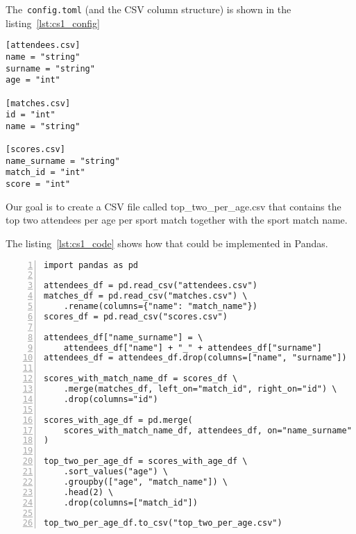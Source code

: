 The~\verb|config.toml| (and the CSV column structure) is shown in the listing~\ref{lst:cs1_config}

\begin{lstlisting}[caption=config.toml of the first case study, label={lst:cs1_config}, captionpos=b]
[attendees.csv]
name = "string"
surname = "string"
age = "int"

[matches.csv]
id = "int"
name = "string"

[scores.csv]
name_surname = "string"
match_id = "int"
score = "int"
\end{lstlisting}

Our goal is to create a CSV file called top\_two\_per\_age.csv that contains the top two attendees per age per sport match
together with the sport match name.

The listing~\ref{lst:cs1_code} shows how that could be implemented in Pandas.

\begin{lstlisting}[caption=Solution of the first case study in Pandas, label={lst:cs1_code}, captionpos=b, numbers=left]
import pandas as pd

attendees_df = pd.read_csv("attendees.csv")
matches_df = pd.read_csv("matches.csv") \
    .rename(columns={"name": "match_name"})
scores_df = pd.read_csv("scores.csv")

attendees_df["name_surname"] = \
    attendees_df["name"] + "_" + attendees_df["surname"]
attendees_df = attendees_df.drop(columns=["name", "surname"])

scores_with_match_name_df = scores_df \
    .merge(matches_df, left_on="match_id", right_on="id") \
    .drop(columns="id")

scores_with_age_df = pd.merge(
    scores_with_match_name_df, attendees_df, on="name_surname"
)

top_two_per_age_df = scores_with_age_df \
    .sort_values("age") \
    .groupby(["age", "match_name"]) \
    .head(2) \
    .drop(columns=["match_id"])

top_two_per_age_df.to_csv("top_two_per_age.csv")
\end{lstlisting}

